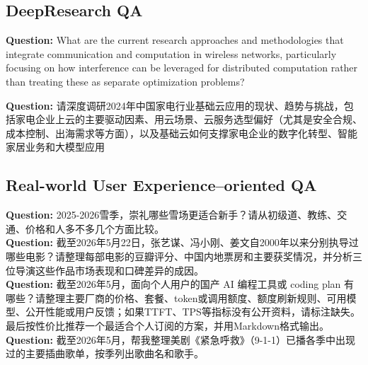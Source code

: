 \documentclass{huawei}
\begin{document}
\subsection{DeepResearch QA}
\label{appendix:DeepResearch QA}
\begin{tcolorbox}[
    title={English Example},
    colback=gray!5,
    colframe=gray!40,
    fonttitle=\bfseries,
    boxrule=0.5pt,
    arc=2pt,
    breakable
]
\ttfamily
\textbf{Question:} What are the current research approaches and methodologies that integrate communication and computation in wireless networks, particularly focusing on how interference can be leveraged for distributed computation rather than treating these as separate optimization problems?
\end{tcolorbox}

\begin{tcolorbox}[
    title={Chinese Example},
    colback=gray!5,
    colframe=gray!40,
    fonttitle=\bfseries,
    boxrule=0.5pt,
    arc=2pt,
    breakable
]
\ttfamily
\textbf{Question:} 请深度调研2024年中国家电行业基础云应用的现状、趋势与挑战，包括家电企业上云的主要驱动因素、用云场景、云服务选型偏好（尤其是安全合规、成本控制、出海需求等方面），以及基础云如何支撑家电企业的数字化转型、智能家居业务和大模型应用

\end{tcolorbox}



\subsection{Real-world User Experience–oriented QA}
\label{appendix:Real-world User Experience–oriented QA}
\begin{tcolorbox}[
    title={Example},
    colback=gray!5,
    colframe=gray!40,
    fonttitle=\bfseries,
    boxrule=0.5pt,
    arc=2pt,
    breakable
]
\ttfamily
\textbf{Question:} 2025-2026雪季，崇礼哪些雪场更适合新手？请从初级道、教练、交通、价格和人多不多几个方面比较。\\

\textbf{Question:} 截至2026年5月22日，张艺谋、冯小刚、姜文自2000年以来分别执导过哪些电影？请整理每部电影的豆瓣评分、中国内地票房和主要获奖情况，并分析三位导演这些作品市场表现和口碑差异的成因。\\

\textbf{Question:} 截至2026年5月，面向个人用户的国产 AI 编程工具或 coding plan 有哪些？请整理主要厂商的价格、套餐、token或调用额度、额度刷新规则、可用模型、公开性能或用户反馈；如果TTFT、TPS等指标没有公开资料，请标注缺失。最后按性价比推荐一个最适合个人订阅的方案，并用Markdown格式输出。\\

\textbf{Question:} 截至2026年5月，帮我整理美剧《紧急呼救》（9-1-1）已播各季中出现过的主要插曲歌单，按季列出歌曲名和歌手。
\end{tcolorbox}
\end{document}
